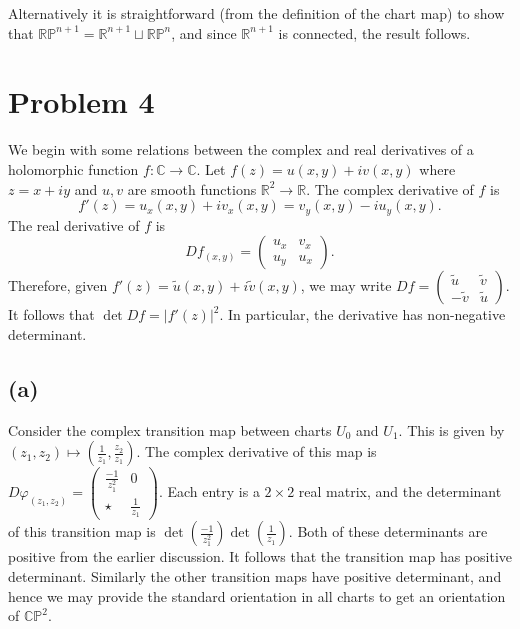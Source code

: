 \documentclass{amsbook}
\theoremstyle{theorem}
\theoremstyle{plain}
\theoremstyle{remark}
\newcommand{\R}{\mathbb R}
\newcommand{\C}{\mathbb C}
\renewcommand{\P}{\mathbb P}
\begin{document}
Alternatively it is straightforward (from the definition of the chart map) to show that $\R\P^{n+1} = \R^{n+1} \sqcup \R\P^n$, and since $\R^{n+1}$ is connected, the result follows.
\chapter*{Problem 4}

We begin with some relations between the complex and real derivatives of a holomorphic function $f: \C \to \C$. Let $f(z) = u(x,y) + iv(x,y)$ where $z=x+iy$ and $u,v$ are smooth functions $\R^2 \to \R$. The complex derivative of $f$ is \[f'(z) = u_x(x,y) + iv_x(x,y) =v_y(x,y) - i u_y(x,y).\] The real derivative of $f$ is \[Df_{(x,y)} =
  \begin{pmatrix}
    u_x & v_x \\ u_y & u_x
  \end{pmatrix}.\] Therefore, given $f'(z) = \tilde u(x,y)+ i\tilde v(x,y)$, we may write $Df =
\begin{pmatrix}
  \tilde u & \tilde v\\
  -\tilde v & \tilde u
\end{pmatrix}$. It follows that $\det Df = |f'(z)|^2$. In particular, the derivative has non-negative determinant.

\section*{(a)}

Consider the complex transition map between charts $U_0$ and $U_1$. This is given by $(z_1, z_2) \mapsto (\frac 1{z_1}, \frac{z_2}{z_1})$. The complex derivative of this map is $ D\varphi_{(z_1, z_2)} = 
\begin{pmatrix}
  \frac{-1}{z_1^2} & 0 \\
  \star & \frac{1}{z_1}
\end{pmatrix}$. Each entry is a $2\times 2$ real matrix, and the determinant of this transition map is $\det (\frac{-1}{z_1^2}) \det (\frac{1}{z_1})$. Both of these determinants are positive from the earlier discussion. It follows that the transition map has positive determinant. Similarly the other transition maps have positive determinant, and hence we may provide the standard orientation in all charts to get an orientation of $\C\P^2$. 
\end{document}
